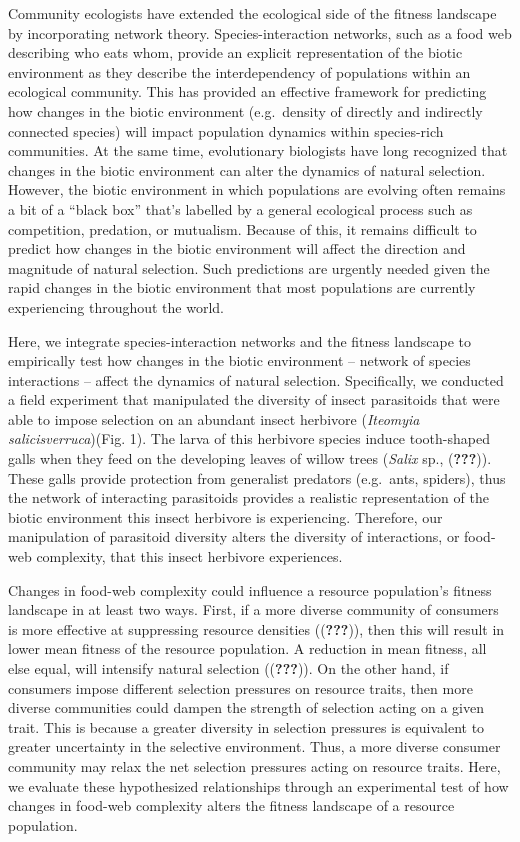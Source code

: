 \documentclass[]{elsarticle} %
\begin{document}
Community ecologists have extended the ecological side of the fitness
landscape by incorporating network theory. Species-interaction networks,
such as a food web describing who eats whom, provide an explicit
representation of the biotic environment as they describe the
interdependency of populations within an ecological community. This has
provided an effective framework for predicting how changes in the biotic
environment (e.g.~density of directly and indirectly connected species)
will impact population dynamics within species-rich communities. At the
same time, evolutionary biologists have long recognized that changes in
the biotic environment can alter the dynamics of natural selection.
However, the biotic environment in which populations are evolving often
remains a bit of a ``black box'' that's labelled by a general ecological
process such as competition, predation, or mutualism. Because of this,
it remains difficult to predict how changes in the biotic environment
will affect the direction and magnitude of natural selection. Such
predictions are urgently needed given the rapid changes in the biotic
environment that most populations are currently experiencing throughout
the world.

Here, we integrate species-interaction networks and the fitness
landscape to empirically test how changes in the biotic environment --
network of species interactions -- affect the dynamics of natural
selection. Specifically, we conducted a field experiment that
manipulated the diversity of insect parasitoids that were able to impose
selection on an abundant insect herbivore (\emph{Iteomyia
salicisverruca})(Fig. 1). The larva of this herbivore species induce
tooth-shaped galls when they feed on the developing leaves of willow
trees (\emph{Salix} sp., ({\textbf{???}})). These galls provide
protection from generalist predators (e.g.~ants, spiders), thus the
network of interacting parasitoids provides a realistic representation
of the biotic environment this insect herbivore is experiencing.
Therefore, our manipulation of parasitoid diversity alters the diversity
of interactions, or food-web complexity, that this insect herbivore
experiences.

Changes in food-web complexity could influence a resource population's
fitness landscape in at least two ways. First, if a more diverse
community of consumers is more effective at suppressing resource
densities (({\textbf{???}})), then this will result in lower mean
fitness of the resource population. A reduction in mean fitness, all
else equal, will intensify natural selection (({\textbf{???}})). On the
other hand, if consumers impose different selection pressures on
resource traits, then more diverse communities could dampen the strength
of selection acting on a given trait. This is because a greater
diversity in selection pressures is equivalent to greater uncertainty in
the selective environment. Thus, a more diverse consumer community may
relax the net selection pressures acting on resource traits. Here, we
evaluate these hypothesized relationships through an experimental test
of how changes in food-web complexity alters the fitness landscape of a
resource population.
\end{document}
